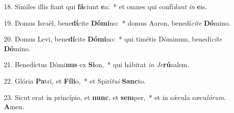 18. Símiles illis fiant qui \textbf{fá}ciunt \textbf{e}a:~*  et omnes qui confí\textit{dunt} \textit{in} \textbf{e}is.\

19. Domus Israël, bene\textbf{dí}cite \textbf{Dó}\textbf{mi}no:~*  domus Aaron, benedí\textit{ci}\textit{te} \textbf{Dó}mino.\

20. Domus Levi, bene\textbf{dí}cite \textbf{Dó}\textbf{mi}no:~*  qui timétis Dóminum, benedí\textit{ci}\textit{te} \textbf{Dó}mino.\

21. Benedíctus Dómi\textbf{nus} ex \textbf{Si}on,~*  qui hábitat \textit{in} \textit{Je}\textbf{rú}salem.\

22. Glória \textbf{Pa}tri, et \textbf{Fí}\textbf{li}o,~*  et Spirí\textit{tu}\textit{i} \textbf{Sanc}to.\

23. Sicut erat in princípio, et \textbf{nunc}, et \textbf{sem}per,~*  et in sǽcula sæcu\textit{ló}\textit{rum}. \textbf{A}men.\


